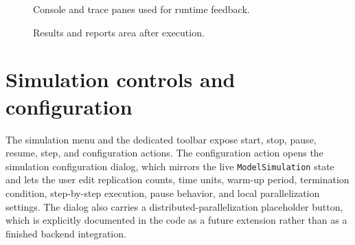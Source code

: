 \begin{figure}[htbp]
\centering
{}
\caption{Console and trace panes used for runtime feedback.}
\label{fig:main-graphical-trace-panel}
\end{figure}

\begin{figure}[htbp]
\centering
{}
\caption{Results and reports area after execution.}
\label{fig:main-graphical-results-panel}
\end{figure}

\section{Simulation controls and configuration}
\label{sec:main-graphical-application-simulation}

The simulation menu and the dedicated toolbar expose start, stop, pause,
resume, step, and configuration actions. The configuration action opens the
simulation configuration dialog, which mirrors the live \texttt{ModelSimulation}
state and lets the user edit replication counts, time units, warm-up period,
termination condition, step-by-step execution, pause behavior, and local
parallelization settings. The dialog also carries a distributed-parallelization
placeholder button, which is explicitly documented in the code as a future
extension rather than as a finished backend integration.

